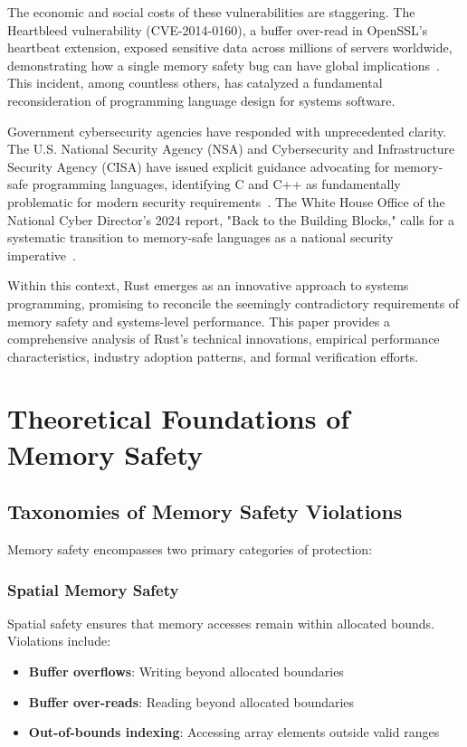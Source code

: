 \documentclass[11pt]{article}
\begin{document}
The economic and social costs of these vulnerabilities are staggering. The Heartbleed vulnerability (CVE-2014-0160), a buffer over-read in OpenSSL's heartbeat extension, exposed sensitive data across millions of servers worldwide, demonstrating how a single memory safety bug can have global implications~\cite{heartbleed2014}. This incident, among countless others, has catalyzed a fundamental reconsideration of programming language design for systems software.

Government cybersecurity agencies have responded with unprecedented clarity. The U.S. National Security Agency (NSA) and Cybersecurity and Infrastructure Security Agency (CISA) have issued explicit guidance advocating for memory-safe programming languages, identifying C and C++ as fundamentally problematic for modern security requirements~\cite{nsa2022guidance,cisa2023urgent}. The White House Office of the National Cyber Director's 2024 report, "Back to the Building Blocks," calls for a systematic transition to memory-safe languages as a national security imperative~\cite{whitehouse2024memo}.

Within this context, Rust emerges as an innovative approach to systems programming, promising to reconcile the seemingly contradictory requirements of memory safety and systems-level performance. This paper provides a comprehensive analysis of Rust's technical innovations, empirical performance characteristics, industry adoption patterns, and formal verification efforts.

\section{Theoretical Foundations of Memory Safety}

\subsection{Taxonomies of Memory Safety Violations}

Memory safety encompasses two primary categories of protection:

\subsubsection{Spatial Memory Safety}
Spatial safety ensures that memory accesses remain within allocated bounds. Violations include:
\begin{itemize}
    \item \textbf{Buffer overflows}: Writing beyond allocated boundaries
    \item \textbf{Buffer over-reads}: Reading beyond allocated boundaries
    \item \textbf{Out-of-bounds indexing}: Accessing array elements outside valid ranges
\end{itemize}
\end{document}
